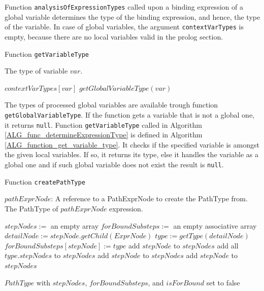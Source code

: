 Function \texttt{analysisOfExpressionTypes} called upon a binding expression of a global variable determines the type of the binding expression, and hence, the type of the variable. In case of global variables, the argument \texttt{contextVarTypes} is empty, because there are no local variables valid in the prolog section.

\begin{algorithm}
\caption{Function \texttt{getVariableType}}
\label{ALG_function_get_variable_type}
\begin{algorithmic}[1]
\ENSURE The type of variable $var$.

     \RETURN $contextVarTypes[var]$
\ELSE
     \RETURN $getGlobalVariableType(var)$
\ENDIF
\end{algorithmic}
\end{algorithm}

The types of processed global variables are available trough function \linebreak \texttt{getGlobalVariableType}. If the function gets a variable that is not a global one, it returns \texttt{null}. Function \texttt{getVariableType} called in Algorithm \ref{ALG_func_determineExpressionType} is defined in Algorithm \ref{ALG_function_get_variable_type}. It checks if the specified variable is amongst the given local variables. If so, it returns its type, else it handles the variable as a global one and if such global variable does not exist the result is \texttt{null}.

\begin{algorithm}
\caption{Function \texttt{createPathType}}
\label{ALG_function_create_path_type}
\begin{algorithmic}[1]
\REQUIRE $pathExprNode$: A reference to a PathExprNode to create the PathType from.
\ENSURE The PathType of $pathExprNode$ expression.

\STATE $stepNodes :=$ an empty array
\STATE $forBoundSubsteps :=$ an empty associative array
	\STATE $detailNode := stepNode.getChild(ExprNode)$
			\STATE $type := getType(detailNode)$ 
				\STATE $forBoundSubsteps[stepNode] := type$
				\STATE add $stepNode$ to $stepNodes$
			\ELSE
				\STATE add all $type.stepNodes$ to $stepNodes$
			\ENDIF
		\ELSE
			\STATE add $stepNode$ to $stepNodes$
		\ENDIF
	\ELSE
		\STATE add $stepNode$ to $stepNodes$
	\ENDIF
\ENDFOR

\RETURN $PathType$ with $stepNodes$, $forBoundSubsteps$, and $isForBound$ set to false
\end{algorithmic}
\end{algorithm}

